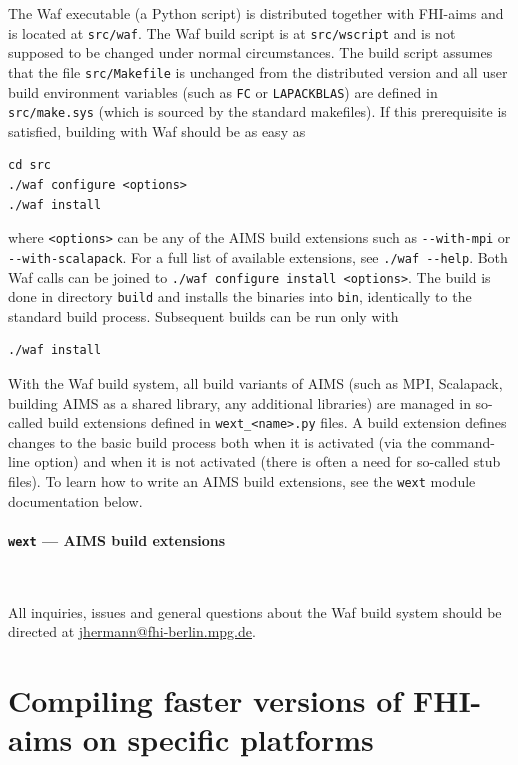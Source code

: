 The Waf executable (a Python script) is distributed together with FHI-aims and 
is located at \verb+src/waf+.
The Waf build script is at \verb+src/wscript+ and is not supposed to be changed 
under normal circumstances.
The build script assumes that the file \verb+src/Makefile+ is unchanged from the 
distributed version and all user build environment variables (such as \verb+FC+ 
or \verb+LAPACKBLAS+) are defined in \verb+src/make.sys+ (which is sourced by 
the standard makefiles).
If this prerequisite is satisfied, building with Waf should be as easy as
\begin{verbatim}
cd src
./waf configure <options>
./waf install
\end{verbatim}
where \verb+<options>+ can be any of the AIMS build extensions such as 
\verb+--with-mpi+ or \verb+--with-scalapack+.
For a full list of available extensions, see
\verb+./waf --help+.
Both Waf calls can be joined to
\verb+./waf configure install <options>+.
The build is done in directory \verb+build+ and installs the binaries into 
\verb+bin+, identically to the standard build process.
Subsequent builds can be run only with
\begin{verbatim}
./waf install
\end{verbatim}

With the Waf build system, all build variants of AIMS (such as MPI, Scalapack, 
building AIMS as a shared library, any additional libraries) are managed in 
so-called build extensions defined in \verb+wext_<name>.py+ files.
A build extension defines changes to the basic build process both when it is 
activated (via the command-line option) and when it is not activated (there is 
often a need for so-called stub files).
To learn how to write an AIMS build extensions, see the \verb+wext+ module 
documentation below.

\paragraph{\texttt{wext} --- AIMS build extensions} \ 



All inquiries, issues and general questions about the Waf build system should be 
directed at 
\href{mailto:jhermann@fhi-berlin.mpg.de?subject=\%5Baims\%20waf\%5D}{jhermann@fhi-berlin.mpg.de}.

\section{Compiling faster versions of FHI-aims on specific platforms}
\label{Sec:Platform}

